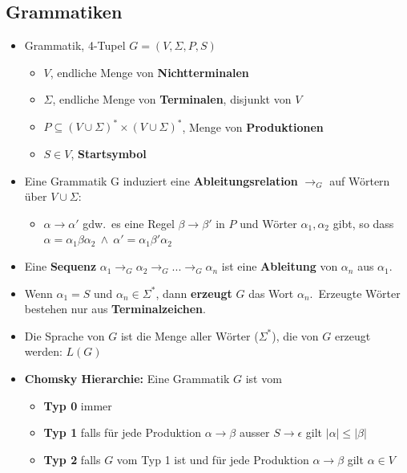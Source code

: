 \documentclass[ieeetran]{article}
\begin{document}
\subsection{Grammatiken} %
\label{sub:grammatiken}
\begin{itemize}
	\item Grammatik, 4-Tupel $G = (V, \Sigma, P, S)$
\begin{itemize}
	\item $V$, endliche Menge von \textbf{Nichtterminalen}
	\item $\Sigma$, endliche Menge von \textbf{Terminalen}, disjunkt von $V$
	\item $P \subseteq (V \cup \Sigma)^* \times (V \cup \Sigma)^*$, Menge von \textbf{Produktionen}
	\item $S \in V$, \textbf{Startsymbol}
\end{itemize} 

\item Eine Grammatik G induziert eine \textbf{Ableitungsrelation} $\rightarrow_G$ auf Wörtern über $V \cup \Sigma$:
\begin{itemize}
  \item $\alpha \rightarrow \alpha'$ gdw.\ es eine Regel $\beta \rightarrow \beta'$ in $P$ und Wörter $\alpha_1, \alpha_2$ gibt, so dass $\alpha = \alpha_1 \beta \alpha_2 \ \wedge \ \alpha' = \alpha_1 \beta' \alpha_2$
\end{itemize}

\item Eine \textbf{Sequenz} $\alpha_1 \rightarrow_G \alpha_2 \rightarrow_G ... \rightarrow_G \alpha_n$ ist eine \textbf{Ableitung} von $\alpha_n$ aus $\alpha_1$.
\item Wenn $\alpha_1 = S$ und $\alpha_n \in \Sigma^*$, dann \textbf{erzeugt} $G$ das Wort $\alpha_n$.\ Erzeugte Wörter bestehen nur aus \textbf{Terminalzeichen}.

\item Die Sprache von $G$ ist die Menge aller Wörter ($\Sigma^*$), die von $G$ erzeugt werden: $L(G)$

\item \textbf{Chomsky Hierarchie:} Eine Grammatik $G$ ist vom
\begin{itemize}
  \item \textbf{Typ 0} immer
\item \textbf{Typ 1} falls für jede Produktion $\alpha \rightarrow \beta$ ausser $S \rightarrow \epsilon$ gilt $|\alpha| \le |\beta|$
\item \textbf{Typ 2} falls $G$ vom Typ 1 ist und für jede Produktion $\alpha \rightarrow \beta$ gilt $\alpha \in V$


\end{itemize}
\end{itemize}
\end{document}
